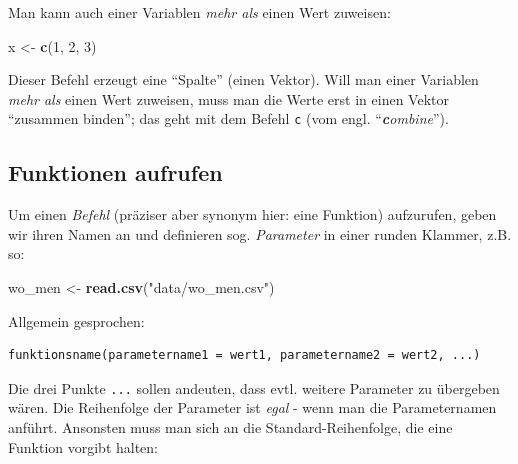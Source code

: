 \documentclass[12pt,ngerman,]{book}
\makeatletter
\newenvironment{Shaded}{\begin{snugshade}}{\end{snugshade}}
\newcommand{\KeywordTok}[1]{\textcolor[rgb]{0.13,0.29,0.53}{\textbf{{#1}}}}
\newcommand{\DecValTok}[1]{\textcolor[rgb]{0.00,0.00,0.81}{{#1}}}
\newcommand{\StringTok}[1]{\textcolor[rgb]{0.31,0.60,0.02}{{#1}}}
\newcommand{\NormalTok}[1]{{#1}}
\newenvironment{kframe}{%
\medskip{}
\setlength{\fboxsep}{.8em}
 \def\at@end@of@kframe{}%
 \ifinner\ifhmode%
  \def\at@end@of@kframe{\end{minipage}}%
  \begin{minipage}{\columnwidth}%
 \fi\fi%
 \def\FrameCommand##1{\hskip\@totalleftmargin \hskip-\fboxsep
 \colorbox{shadecolor}{##1}\hskip-\fboxsep
     \hskip-\linewidth \hskip-\@totalleftmargin \hskip\columnwidth}%
 \MakeFramed {\advance\hsize-\width
   \@totalleftmargin\z@ \linewidth\hsize
   \@setminipage}}%
 {\par\unskip\endMakeFramed%
 \at@end@of@kframe}
\renewenvironment{Shaded}{\begin{kframe}}{\end{kframe}}
\theoremstyle{definition}
\theoremstyle{definition}
\theoremstyle{remark}
\makeatother
\begin{document}
Man kann auch einer Variablen \emph{mehr als} einen Wert zuweisen:

\begin{Shaded}
\begin{Highlighting}[]
\NormalTok{x <-}\StringTok{ }\KeywordTok{c}\NormalTok{(}\DecValTok{1}\NormalTok{, }\DecValTok{2}\NormalTok{, }\DecValTok{3}\NormalTok{)}
\end{Highlighting}
\end{Shaded}

Dieser Befehl erzeugt eine ``Spalte'' (einen Vektor). Will man einer
Variablen \emph{mehr als} einen Wert zuweisen, muss man die Werte erst
in einen Vektor ``zusammen binden''; das geht mit dem Befehl \texttt{c}
(vom engl. ``\emph{\textbf{c}ombine}'').

\subsection{Funktionen aufrufen}\label{funktionen-aufrufen}

Um einen \emph{Befehl} (präziser aber synonym
hier: eine Funktion) aufzurufen, geben wir ihren Namen an und definieren
sog. \emph{Parameter} in einer runden
Klammer, z.B. so:

\begin{Shaded}
\begin{Highlighting}[]
\NormalTok{wo_men <-}\StringTok{ }\KeywordTok{read.csv}\NormalTok{(}\StringTok{"data/wo_men.csv"}\NormalTok{)}
\end{Highlighting}
\end{Shaded}

Allgemein gesprochen:

\begin{verbatim}
funktionsname(parametername1 = wert1, parametername2 = wert2, ...)
\end{verbatim}

Die drei Punkte \texttt{...} sollen andeuten, dass evtl. weitere
Parameter zu übergeben wären. Die Reihenfolge der Parameter ist
\emph{egal} - wenn man die Parameternamen anführt. Ansonsten muss man
sich an die Standard-Reihenfolge, die eine Funktion vorgibt halten:
\end{document}
